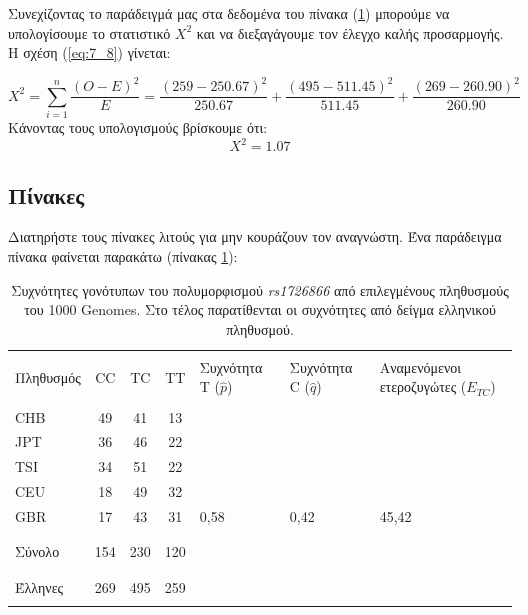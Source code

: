 \begin{refsection}
Συνεχίζοντας το παράδειγμά μας στα δεδομένα του πίνακα (\ref{table:table}) μπορούμε να υπολογίσουμε το στατιστικό $X^{2}$ και να διεξαγάγουμε τον έλεγχο καλής προσαρμογής. Η σχέση (\ref{eq:7_8}) γίνεται:

$$X^{2}= \sum_{i=1}^{n}\frac{(O-E)^{2}}{E}=\frac{(259-250.67)^{2}}{250.67}+ \frac{(495-511.45)^{2}}{511.45}+\frac{(269-260.90)^{2}}{260.90}$$
Κάνοντας τους υπολογισμούς βρίσκουμε ότι:
$$ X^{2}=1.07 $$

\subsection{Πίνακες}
Διατηρήστε τους πίνακες λιτούς για μην κουράζουν τον αναγνώστη. Ένα παράδειγμα πίνακα φαίνεται παρακάτω
(πίνακας \ref{table:table}):
\begin{table} [h] \centering \small
\caption[Συχνότητες γονότυπων του πολυμορφισμού \textit{rs1726866}]{Συχνότητες γονότυπων του πολυμορφισμού \textit{rs1726866} από επιλεγμένους πληθυσμούς του 1000 Genomes. Στο τέλος παρατίθενται οι συχνότητες από δείγμα ελληνικού πληθυσμού.}
\vspace{2mm}
\begin{tabular} {l c c c p{2cm} p{2cm} p{2.5cm}}
 \hline
 	&	&	&	&	&	&	\\
Πληθυσμός&CC	&TC	&TT	&Συχνότητα Τ ($\hat{p}$) & Συχνότητα C ($\hat{q}$) & Αναμενόμενοι ετεροζυγώτες ($E_{TC}$)\\
 \hline
	&	&	&	&	&	&	\\
CHB	&49	&41	&13	&	&	&	\\
JPT	&36	&46	&22	&	&	&	\\
TSI	&34	&51	&22	&	&	&	\\
CEU	&18	&49	&32	&	&	&	\\
GBR	&17	&43	&31	&0,58	&0,42	&45,42	\\
	&	&	&	&	&	&	\\
\hline
	&	&	&	&	&	&	\\
Σύνολο	&154	&230	&120	&	&	&	\\
	&	&	&	&	&	&	\\
\hline
	&	&	&	&	&	&	\\
Έλληνες	&269	&495	&259	&	&	&	\\
	&	&	&	&	&	&	\\
 \hline
\end{tabular}
\label{table:table}
\end{table}

\end{refsection}
